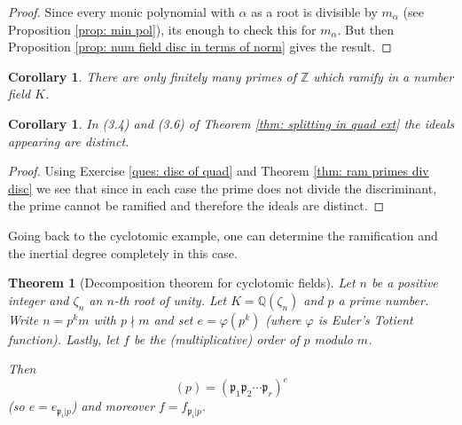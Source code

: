 \documentclass[11pt,a4paper]{report}
\theoremstyle{plain}
\newtheorem{theorem}[subsection]{Theorem}
\newtheorem{corollary}[subsection]{Corollary}
\theoremstyle{definition}
\theoremstyle{definition}
\newcommand{\ZZ}{\mathbb{Z}}
\def\QQ{\mathbb{Q}}
\def\gothp{\mathfrak{p}}
\def \a{\alpha}
\begin{document}
	\begin{proof}
		Since every monic polynomial with $\a$ as a root is divisible by $m_\a$ (see Proposition \ref{prop: min pol}), its enough to check this for $m_\a$. But then Proposition \ref{prop: num field disc in terms of norm} gives the result.
	\end{proof}
	
	\begin{corollary}
		There are only finitely many primes of\/ $\ZZ$ which ramify in  a number field $K$.
	\end{corollary}
	
	\begin{corollary}\label{cor: ids are disc}
		In (3.4) and (3.6) of Theorem \ref{thm: splitting in quad ext}   the ideals appearing are distinct.
	\end{corollary}
	
	\begin{proof}
		Using Exercise \ref{ques: disc of quad} and Theorem \ref{thm: ram primes div disc} we see that since in each case the prime does not divide the discriminant, the prime cannot be ramified and therefore the ideals are distinct.
	\end{proof}
	
	
	
	Going back to the cyclotomic example, one can determine the ramification and the inertial degree completely in this case.
	
	\begin{theorem}[Decomposition theorem for cyclotomic fields]
		Let $n$ be a positive integer and $\zeta_n$ an $n$-th root of unity. Let $K=\QQ(\zeta_n)$ and $p$ a prime number. Write $n=p^km$ with $p \nmid m$ and set $e=\varphi(p^k)$ (where $\varphi$ is Euler's Totient function). Lastly, let $f$ be the (multiplicative) order of $p$ modulo $m$. 
		
		Then \[(p)=(\gothp_1 \gothp_2\cdots \gothp_r)^e\] (so $e=e_{\gothp_i|p}$) and moreover $f=f_{\gothp_i|p}$.
	\end{theorem}
	
\end{document}
